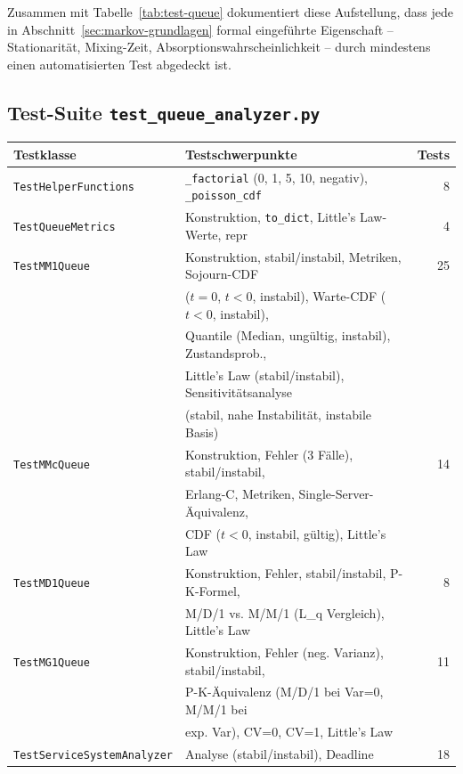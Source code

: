 ﻿\documentclass[a4paper,12pt]{report}
\theoremstyle{definition}
\begin{document}
Zusammen mit Tabelle~\ref{tab:test-queue} dokumentiert diese Aufstellung, dass jede in Abschnitt~\ref{sec:markov-grundlagen} formal eingeführte Eigenschaft -- Stationarität, Mixing-Zeit, Absorptionswahrscheinlichkeit -- durch mindestens einen automatisierten Test abgedeckt ist.

\subsection{Test-Suite \texttt{test\_queue\_analyzer.py}}

\begin{table}
	\centering
	\begin{tabular}{@{}llr@{}}
		\toprule
		\textbf{Testklasse} & \textbf{Testschwerpunkte} & \textbf{Tests} \\
		\midrule
		\texttt{TestHelperFunctions} & \texttt{\_factorial} (0, 1, 5, 10, negativ),
		\texttt{\_poisson\_cdf} & 8 \\
		\texttt{TestQueueMetrics} & Konstruktion, \texttt{to\_dict},
		Little's Law-Werte, repr & 4 \\
		\texttt{TestMM1Queue} & Konstruktion, stabil/instabil, Metriken,
		Sojourn-CDF & 25 \\
		& ($t=0$, $t<0$, instabil), Warte-CDF ($t<0$, instabil), & \\
		& Quantile (Median, ungültig, instabil), Zustandsprob., & \\
		& Little's Law (stabil/instabil), Sensitivitätsanalyse & \\
		& (stabil, nahe Instabilität, instabile Basis) & \\
		\texttt{TestMMcQueue} & Konstruktion, Fehler (3 Fälle), stabil/instabil, & 14 \\
		& Erlang-C, Metriken, Single-Server-Äquivalenz, & \\
		& CDF ($t<0$, instabil, gültig), Little's Law & \\
		\texttt{TestMD1Queue} & Konstruktion, Fehler, stabil/instabil, P-K-Formel, & 8 \\
		& M/D/1 vs. M/M/1 (L\_q Vergleich), Little's Law & \\
		\texttt{TestMG1Queue} & Konstruktion, Fehler (neg. Varianz), stabil/instabil, & 11 \\
		& P-K-Äquivalenz (M/D/1 bei Var=0, M/M/1 bei & \\
		& exp. Var), CV=0, CV=1, Little's Law & \\
		\texttt{TestServiceSystemAnalyzer} & Analyse (stabil/instabil), Deadline & 18 \\

\end{tabular}
\end{table}
\end{document}
